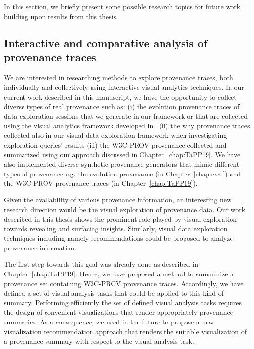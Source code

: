 In this section, we briefly present some possible research topics for future work building upon results from this thesis.



\subsection{Interactive and comparative analysis of provenance traces}
\label{sec:future1}
We are interested in researching methods to explore provenance traces, both individually and collectively using interactive visual analytics techniques.
In our current work described in this manuscript, we have the opportunity to collect diverse types of real provenance such as: (i) the evolution provenance traces of data exploration sessions that we generate in our framework \framework{} or that are collected using the visual analytics framework developed in~\cite{Bruder2019} (ii) the why provenance traces collected also in our visual data exploration framework \framework{} when investigating exploration queries' results (iii) the W3C-PROV provenance collected and summarized using our approach discussed in Chapter~\ref{chap:TaPP19}.
We have also implemented diverse synthetic provenance generators that mimic different types of provenance e.g. the evolution provenance (in Chapter~\ref{chap:eval}) and the W3C-PROV provenance traces (in Chapter~\ref{chap:TaPP19}).



Given the availability of various provenance information, an interesting new research direction would be the visual exploration of provenance data. 
Our work described in this thesis shows the prominent role played by visual exploration towards revealing and surfacing insights. Similarly, visual data exploration techniques including namely recommendations could be proposed to analyze provenance information.

The first step towards this goal was already done as described in Chapter~\ref{chap:TaPP19}. Hence, we have proposed a method to summarize a provenance set containing W3C-PROV provenance traces. Accordingly, we have defined a set of visual analysis tasks that could be applied to this kind of summary. 
Performing efficiently the set of defined visual analysis tasks requires the design of convenient visualizations that render appropriately provenance summaries.
As a consequence, we need in the future to propose  a new visualization recommendation approach that renders the suitable visualization of a provenance summary with respect to the visual analysis task.




